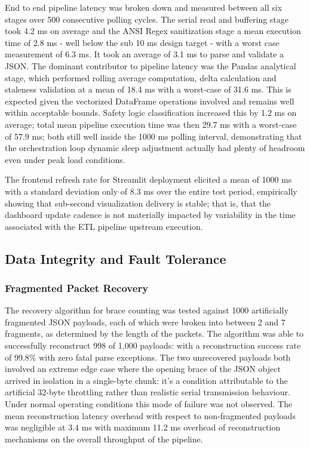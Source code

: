 \documentclass[conference]{IEEEtran}
\begin{document}
End to end pipeline latency was broken down and measured between all six stages over 500 consecutive polling cycles. The serial read and buffering stage took 4.2 ms on average and the ANSI Regex sanitization stage a mean execution time of 2.8 ms - well below the sub 10 ms design target - with a worst case measurement of 6.3 ms. It took an average of 3.1 ms to parse and validate a JSON. The dominant contributor to pipeline latency was the Pandas analytical stage, which performed rolling average computation, delta calculation and staleness validation at a mean of 18.4 ms with a worst-case of 31.6 ms. This is expected given the vectorized DataFrame operations involved and remains well within acceptable bounds. Safety logic classification increased this by 1.2 ms on average; total mean pipeline execution time was then 29.7 ms with a worst-case of 57.9 ms; both still well inside the 1000 ms polling interval, demonstrating that the orchestration loop dynamic sleep adjustment actually had plenty of headroom even under peak load conditions.

The frontend refresh rate for Streamlit deployment elicited a mean of 1000 ms with a standard deviation only of 8.3 ms over the entire test period, empirically showing that sub-second visualization delivery is stable; that is, that the dashboard update cadence is not materially impacted by variability in the time associated with the ETL pipeline upstream execution.

\subsection{Data Integrity and Fault Tolerance}

\subsubsection{Fragmented Packet Recovery}
The recovery algorithm for brace counting was tested against 1000 artificially fragmented JSON payloads, each of which were broken into between 2 and 7 fragments, as determined by the length of the packets. The algorithm was able to successfully reconstruct 998 of 1,000 payloads: with a reconstruction success rate of 99.8\% with zero fatal parse exceptions. The two unrecovered payloads both involved an extreme edge case where the opening brace of the JSON object arrived in isolation in a single-byte chunk: it’s a condition attributable to the artificial 32-byte throttling rather than realistic serial transmission behaviour. Under normal operating conditions this mode of failure was not observed. The mean reconstruction latency overhead with respect to non-fragmented payloads was negligible at 3.4 ms with maximum 11.2 ms overhead of reconstruction mechanisms on the overall throughput of the pipeline.
\end{document}

